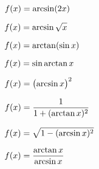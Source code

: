 \begin{multicols}{2}
\problem $\displaystyle f(x) = \arcsin(2x)$ 




\problem $\displaystyle f(x) = \arcsin\sqrt x $ 




\problem $\displaystyle f(x) = \arctan(\sin x)$ 




\problem $\displaystyle f(x) = \sin\arctan x $ 




\problem $\displaystyle f(x) = \bigl(\arcsin x\bigr)^2 $ 




\problem $\displaystyle f(x) = \frac{1}{1+(\arctan x)^2} $ 




\problem $\displaystyle f(x) = \sqrt{1-(\arcsin x)^2}$ 




\problem $\displaystyle f(x) = \frac{\arctan x}{\arcsin x}$ 
\end{multicols}




